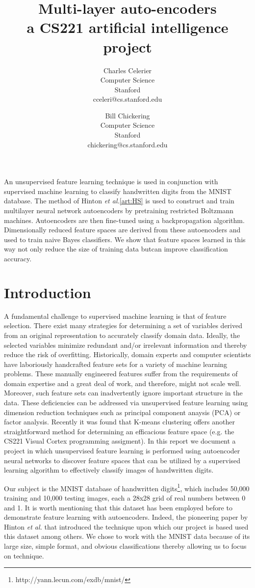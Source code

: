 \documentclass{article}
\title{Multi-layer auto-encoders \\
    \large{a CS221 artificial intelligence project}}
\author{
    Charles Celerier \\
    Computer Science \\
    Stanford \\
    cceleri@cs.stanford.edu
  \and
    Bill Chickering \\
    Computer Science \\
    Stanford \\
    chickering@cs.stanford.edu
}
\begin{document}
\maketitle

An unsupervised feature learning technique is used in conjunction with supervised machine learning to classify handwritten digits from the MNIST database. The method of Hinton {\em et al.}\ref{art:HS} is used to construct and train multilayer neural network autoencoders by pretraining restricted Boltzmann machines. Autoencoders are then fine-tuned using a backpropagation algorithm. Dimensionally reduced feature spaces are derived from these autoencoders and used to train naive Bayes classifiers. We show that feature spaces learned in this way not only reduce the size of training data butcan improve classification accuracy.

\section{Introduction}\label{sec:introduction}

A fundamental challenge to supervised machine learning is that of feature
selection. There exist many strategies for determining a set of variables
derived from an original representation to accurately classify domain data.
Ideally, the selected variables minimize redundant and/or irrelevant information
and thereby reduce the risk of overfitting. Historically, domain experts and
computer scientists have laboriously handcrafted feature sets for a variety of
machine learning problems. These manually engineered features suffer from the
requirements of domain expertise and a great deal of work, and therefore, might
not scale well. Moreover, such feature sets can inadvertently ignore important
structure in the data. These deficiencies can be addressed via unsupervised
feature learning using dimension reduction techniques such as principal
component anaysis (PCA) or factor analysis. Recently it was found that K-means
clustering offers another straightforward method for determining an efficacious
feature space (e.g. the CS221 Visual Cortex programming assigment). In this
report we document a project in which unsupervised feature learning is performed
using autoencoder neural networks to discover feature spaces that can be
utilized by a supervised learning algorithm to effectively classify images of
handwritten digits.

Our subject is the MNIST database of handwritten
digits\footnote{http://yann.lecun.com/exdb/mnist/}, which includes 50,000
training and 10,000 testing images, each a 28x28 grid of real numbers between 0
and 1. It is worth mentioning that this dataset has been employed before to
demonstrate feature learning with autoencoders. Indeed, the pioneering paper by
Hinton {\em et al.}\cite{art:HS} that introduced the technique upon which our
project is based used this dataset among others. We chose to work with the MNIST
data because of its large size, simple format, and obvious classifications
thereby allowing us to focus on technique.
\end{document}
